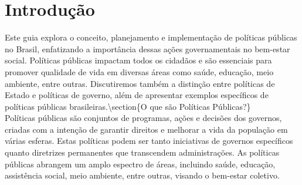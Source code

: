 \documentclass[
   article,       
   12pt,          
   oneside,       
   a4paper,       
   english,       
   brazil,        
   sumario=tradicional
   ]{abntex2}
\begin{document}
\section{Introdução}
Este guia explora o conceito, planejamento e implementação de políticas públicas no Brasil, enfatizando a importância dessas ações governamentais no bem-estar social. Políticas públicas impactam todos os cidadãos e são essenciais para promover qualidade de vida em diversas áreas como saúde, educação, meio ambiente, entre outras. Discutiremos também a distinção entre políticas de Estado e políticas de governo, além de apresentar exemplos específicos de políticas públicas brasileiras.\textbackslash{}section\{O que são Políticas Públicas?\}\\Políticas públicas são conjuntos de programas, ações e decisões dos governos, criadas com a intenção de garantir direitos e melhorar a vida da população em várias esferas. Estas políticas podem ser tanto iniciativas de governos específicos quanto diretrizes permanentes que transcendem administrações. As políticas públicas abrangem um amplo espectro de áreas, incluindo saúde, educação, assistência social, meio ambiente, entre outras, visando o bem-estar coletivo.
\end{document}
